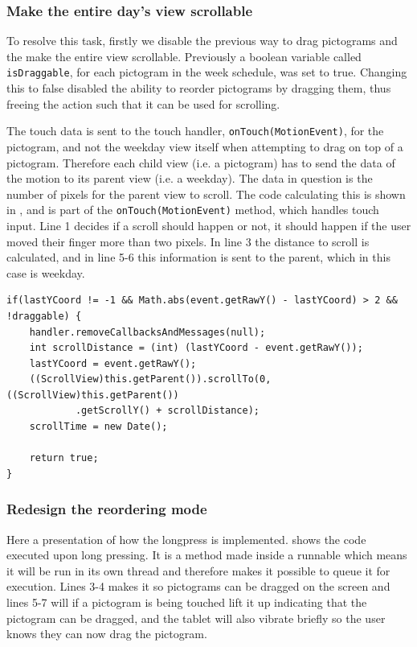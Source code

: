 \subsubsection{Make the entire day's view scrollable}
To resolve this task, firstly we disable the previous way to drag pictograms and the make the entire view scrollable.
Previously a boolean variable called \texttt{isDraggable}, for each pictogram in the week schedule, was set to true.
Changing this to false disabled the ability to reorder pictograms by dragging them, thus freeing the action such that it can be used for scrolling.

The touch data is sent to the touch handler, \texttt{onTouch(MotionEvent)}, for the pictogram, and not the weekday view itself when attempting to drag on top of a pictogram.
Therefore each child view (i.e. a pictogram) has to send the data of the motion to its parent view (i.e. a weekday).
The data in question is the number of pixels for the parent view to scroll.
The code calculating this is shown in , and is part of the \texttt{onTouch(MotionEvent)} method, which handles touch input.
Line 1 decides if a scroll should happen or not, it should happen if the user moved their finger more than two pixels.
In line 3 the distance to scroll is calculated, and in line 5-6 this information is sent to the parent, which in this case is weekday.

\begin{lstlisting}[float, floatplacement=b, caption={The code executed when someone performs a move action.}, label={lst:actionmove}]
if(lastYCoord != -1 && Math.abs(event.getRawY() - lastYCoord) > 2 && !draggable) {
    handler.removeCallbacksAndMessages(null);
    int scrollDistance = (int) (lastYCoord - event.getRawY());
    lastYCoord = event.getRawY();
    ((ScrollView)this.getParent()).scrollTo(0, ((ScrollView)this.getParent())
            .getScrollY() + scrollDistance);
    scrollTime = new Date();

    return true;
}
\end{lstlisting}

\subsubsection{Redesign the reordering mode}
Here a presentation of how the longpress is implemented.
 shows the code executed upon long pressing.
It is a method made inside a runnable which means it will be run in its own thread and therefore makes it possible to queue it for execution.
Lines 3-4 makes it so pictograms can be dragged on the screen and lines 5-7 will if a pictogram is being touched lift it up indicating that the pictogram can be dragged, and the tablet will also vibrate briefly so the user knows they can now drag the pictogram.


